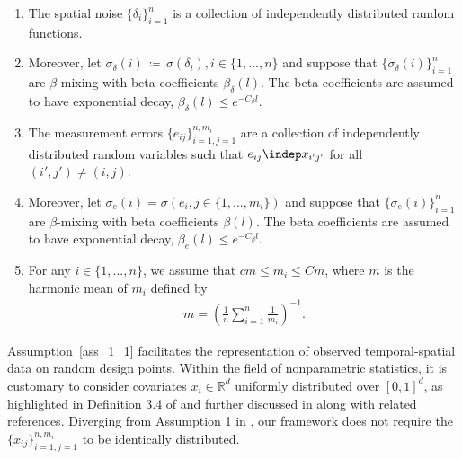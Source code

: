 \documentclass[twoside,11pt]{article}
\begin{document}
\begin{assumption}
\begin{enumerate}[label={\bfseries\arabic*.}, ref={\ref{Assumption 1.}.\arabic*}]
\item \label{ass_1_3}The spatial noise $\{\delta_i\}_{i=1}^{n}$ is a collection of independently distributed random functions. 
\item  Moreover, let \(\sigma_{\delta}(i) \,\coloneqq\, \sigma(\delta_i), i \in \{1,...,n\}\) and suppose that \(\{\sigma_{\delta}(i)\}^n_{i=1}\) are \(\beta\)-mixing with beta coefficients \(\beta_{\delta}(l)\). The beta coefficients are assumed to have exponential decay, \(\beta_{\delta}(l) \leq  e^{-C_\beta l}\).
\item \label{ass_1_4}The measurement errors $\{e_{ij}\}_{i=1,j=1}^{n,m_i}$ are a collection of independently distributed random variables such that $e_{ij} \indep x_{i'j'} $ for all $(i',j') \neq (i,j)$.
\item  Moreover, let \( \sigma_{e}(i) =  \sigma(e_i, j \in \{1,...,m_i\}) \) and suppose that \( \{\sigma_e(i)\}^n_{i=1} \) are \(\beta\)-mixing with beta coefficients \( \beta(l) \). The beta coefficients are assumed to have exponential decay, \( \beta_e(l) \leq  e^{-C_\beta l} \). 
\item \label{asm:m} For any $i \in \{1,...,n\}$, we assume that $cm \leq  m_i \leq  Cm$, where $m$ is the harmonic mean of $m_i$ defined by
\begin{align}
m = \left( \frac{1}{n} \sum_{i=1}^n \frac{1}{m_i} \right)^{-1}.
\end{align}    


\end{enumerate}
\end{assumption}

Assumption~\ref{ass_1_1} facilitates the representation of observed temporal-spatial data on random design points. Within the field of nonparametric statistics, it is customary to consider covariates \(x_i \in \mathbb{R}^d\) uniformly distributed over \([0,1]^d\), as highlighted in Definition 3.4 of \cite{gyorfi2002distribution} and further discussed in \cite{madrid2020adaptive} along with related references. Diverging from Assumption 1 in \cite{padilla2023temporal}, our framework does not require the \(\{x_{ij}\}_{i=1,j=1}^{n,m_i}\) to be identically distributed.
\end{document}
